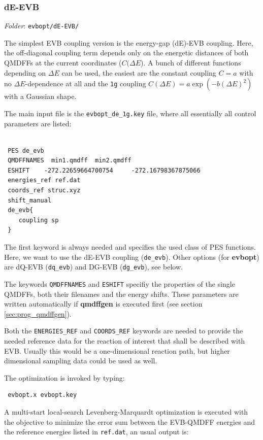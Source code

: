 \documentclass[12pt,a4paper]{scrartcl}
\begin{document}
\subsubsection{dE-EVB}

\textit{Folder}: \texttt{evbopt/dE-EVB/} \newline

The simplest EVB coupling version is the energy-gap (dE)-EVB coupling.
Here, the off-diagonal coupling term depends only on the energetic distances of both
QMDFFs at the current coordinates ($C(\Delta E$).
A bunch of different functions depending on $\Delta E$ can be used, the easiest are
the constant coupling $C=a$ with no $\Delta E$-dependence at all and the \texttt{1g} 
coupling $C(\Delta E)=a \exp\left(-b (\Delta E)^2\right)$ with a Gaussian shape.

The main input file is the \texttt{evbopt\_de\_1g.key} file, where all essentially all
control parameters are listed:

\begin{verbatim}

 PES de_evb
 QMDFFNAMES  min1.qmdff  min2.qmdff
 ESHIFT    -272.22659664700754     -272.16798367875066
 energies_ref ref.dat
 coords_ref struc.xyz
 shift_manual
 de_evb{
    coupling sp
 }
\end{verbatim}

The first keyword is always needed and specifies the used class of PES functions. Here, we 
want to use the dE-EVB coupling (\texttt{de\_evb}). Other options (for \textbf{evbopt}) are
dQ-EVB (\texttt{dq\_evb}) and DG-EVB (\texttt{dg\_evb}), see below.

The keywords \texttt{QMDFFNAMES} and \texttt{ESHIFT} specifiy the properties of the 
single QMDFFs, both their filenames and the energy shifts. These parameters are written 
automatically if \textbf{qmdffgen} is executed first (see section \ref{sec:prog_qmdffgen}).

Both the \texttt{ENERGIES\_REF} and \texttt{COORDS\_REF} keywords are needed to provide the 
needed reference data for the reaction of interest that shall be described with EVB.
Usually this would be a one-dimensional reaction path, but higher dimensional sampling 
data could be used as well.

The optimization is invoked by typing:

\begin{verbatim}
 evbopt.x evbopt.key
\end{verbatim}

A multi-start local-search Levenberg-Marquardt optimization is executed with the objective 
to minimize the error sum between the EVB-QMDFF energies and the reference energies listed 
in \texttt{ref.dat}, an usual output is:
\end{document}
